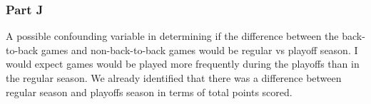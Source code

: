 \documentclass[11pt]{article}
\begin{document}
    \subsubsection*{Part J}\label{part-j}

A possible confounding variable in determining if the difference between
the back-to-back games and non-back-to-back games would be regular vs
playoff season. I would expect games would be played more frequently
during the playoffs than in the regular season. We already identified
that there was a difference between regular season and playoffs season
in terms of total points scored.


    
    
    
    
\end{document}
